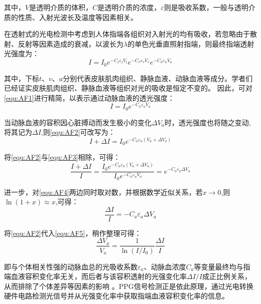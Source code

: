 其中，$V$是透明介质的体积，$C$是透明介质的浓度，$\varepsilon$则是吸收系数，一般与透明介质的性质、入射光波长及温度等因素相关。

在透射式的光电检测中考虑到人体指端各组织对入射光的均有吸收，若忽略由于散射、反射等因素造成的衰减，以波长为$\lambda$的单色光垂直照射指端，则最终指端透射光强度为\cite{4122392}：
\begin{equation}
    \label{equ:AF1}
    I=I_{0}e^{-C_{t}\varepsilon _{t}V_{t}}e^{-C_{v}\varepsilon _{v}V_{v}} e^{-C_{a}\varepsilon _{a}V_{a}} 
\end{equation}

其中，下标$t$、$v$、$a$分别代表皮肤肌肉组织、静脉血液、动脉血液等成分。学者们已经证实皮肤肌肉组织、静脉血液等组织对光的吸收是恒定不变的\cite{1980Spectrophotometric,4122392}。
因此，可对\autoref{equ:AF1}进行精简，以表示通过动脉血液的透光强度\cite{PPGYY}：
\begin{equation}
    \label{equ:AF2}
    I=I_{0}e^{-C_{a}\varepsilon _{a}V_{a}} 
\end{equation}

当动脉血液的容积因心脏搏动而发生极小的变化$\Delta V_{a}$时，透光强度也将随之变动,将其记为$\Delta I$,则\autoref{equ:AF2}可改写为：
\begin{equation}
    \label{equ:AF3}
    I+\Delta I=I_{0}e^{-C_{a}\varepsilon _{a}(V_{a}+\Delta V_{a})} 
\end{equation}

将\autoref{equ:AF2}与\autoref{equ:AF3}相除，可得：
\begin{equation}
    \label{equ:AF4}
    \frac{I+\Delta I}{I}=\frac{I_{0}e^{-C_{a}\varepsilon _{a}(V_{a}+\Delta V_{a})}}{I_{0}e^{-C_{a}\varepsilon _{a}V_{a}}}=e^{-C_{a}\varepsilon _{a}\Delta V_{a}} 
\end{equation}

进一步，对\autoref{equ:AF4}两边同时取对数，并根据数学近似关系，若$x\rightarrow 0$,则$\ln(1+x)\approx x$,可得：
\begin{equation}
    \label{equ:AF5}
    \frac{\Delta I}{I}=-C_{a}\varepsilon _{a}\Delta V_{a}
\end{equation}

将\autoref{equ:AF2}代入\autoref{equ:AF5}，稍作整理可得：
\begin{equation}
    \label{equ:AF6}
    \frac{\Delta V_{a}}{V_{a}}=\frac{1}{\ln(I/I_{0})}\frac{\Delta I}{I}
\end{equation}

即与个体相关性强的动脉血总的光吸收系数$\varepsilon _{a}$、动脉血浓度$C_{a}$等变量最终均与指端血液容积变化率无关，而后者与该容积透射的光强变化率$\Delta I/I$成正比例关系，从而排除了个体差异等因素的影响
\cite{1980Spectrophotometric,4122392,PPGYY}。PPG信号检测正是依此原理，通过光电转换硬件电路检测光信号并从光强变化率中获取指端血液容积变化率的信息。
